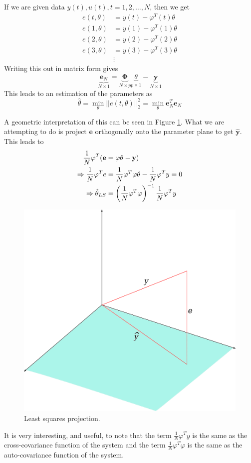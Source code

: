 If we are given data $y(t),u(t),t=1,2,\ldots,N$, then we get
\begin{align*}
e(t,\theta) &= y(t) - \varphi^T(t)\theta \\
e(1,\theta) &= y(1) - \varphi^T(1)\theta \\
e(2,\theta) &= y(2) - \varphi^T(2)\theta \\
e(3,\theta) &= y(3) - \varphi^T(3)\theta \\
&\vdots
\end{align*}
Writing this out in matrix form gives
$$\underbrace{\mathbf{e}_N}_{N\times 1} = \underbrace{\mathbf{\Phi}}_{N\times p}\underbrace{\theta}_{p\times 1} - \underbrace{\mathbf{y}}_{N\times 1}$$
This leads to an estimation of the parameters as
$$\hat{\theta} = \min_\theta ||e(t,\theta)||_2^2 = \min_\theta \mathbf{e}_N^T\mathbf{e}_N$$

A geometric interpretation of this can be seen in Figure \ref{fig:07ls}. What we are attempting to do is project $\mathbf{e}$ orthogonally onto the parameter plane to get $\hat{\mathbf{y}}$. This leads to
\begin{align*}
\frac{1}{N}\varphi^T(\mathbf{e} &= \mathbf{\varphi}\mathbf{\theta} - \mathbf{y}) \\
\Rightarrow \frac{1}{N}\varphi^Te &= \frac{1}{N}\varphi^T\varphi\theta - \frac{1}{N}\varphi^Ty = 0 \\
\Rightarrow \hat{\theta}_{LS} &= \left(\frac{1}{N}\varphi^T\varphi\right)^{-1}\frac{1}{N}\varphi^Ty
\end{align*}

\begin{figure}[ht!]
  \centering
  \includegraphics[width=.4\textwidth]{images/07ls}
  \caption{Least squares projection.}
  \label{fig:07ls}
\end{figure}

It is very interesting, and useful, to note that the term $\frac{1}{N}\varphi^Ty$ is the same as the cross-covariance function of the system and the term $\frac{1}{N}\varphi^T\varphi$ is the same as the auto-covariance function of the system.

